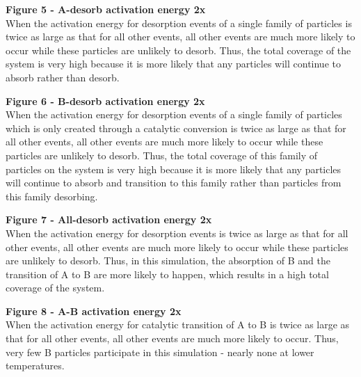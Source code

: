 \documentclass[11pt]{article}
\begin{document}
{\bf{Figure 5 - A-desorb activation energy 2x}}\\
When the activation energy for desorption events of a single family of particles is twice as large as that for all other events, all other events are much more likely to occur while these particles are unlikely to desorb. Thus, the total coverage of the system is very high because it is more likely that any particles will continue to absorb rather than desorb. 


{\bf{Figure 6 - B-desorb activation energy 2x}}\\
When the activation energy for desorption events of a single family of particles which is only created through a catalytic conversion is twice as large as that for all other events, all other events are much more likely to occur while these particles are unlikely to desorb. Thus, the total coverage of this family of particles on the system is very high because it is more likely that any particles will continue to absorb and transition to this family rather than particles from this family desorbing.


{\bf{Figure 7 - All-desorb activation energy 2x}}\\
When the activation energy for desorption events is twice as large as that for all other events, all other events are much more likely to occur while these particles are unlikely to desorb. Thus, in this simulation, the absorption of B and the transition of A to B are more likely to happen, which results in a high total coverage of the system.


{\bf{Figure 8 - A-B activation energy 2x}}\\
When the activation energy for catalytic transition of A to B is twice as large as that for all other events, all other events are much more likely to occur. Thus, very few B particles participate in this simulation - nearly none at lower temperatures.
\end{document}
